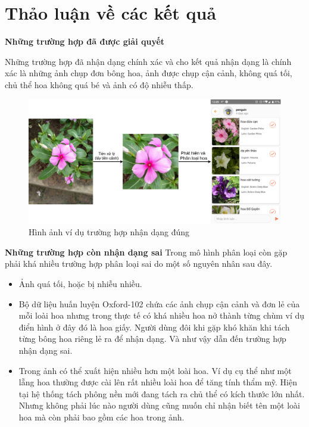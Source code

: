 \documentclass[12pt]{report}
\begin{document}
		\section{Thảo luận về các kết quả}
		
		\textbf{Những trường hợp đã được giải quyết}
		
		Những trường hợp đã nhận dạng chính xác và cho kết quả nhận dạng là chính xác là những ảnh chụp đơn bông hoa, ảnh được chụp cận cảnh, không quá tối, chủ thể hoa không quá bé và ảnh có độ nhiễu thấp.
		
		\begin{figure}[h]
			\centering
			\includegraphics[scale=0.3]{vidunhandangdung}
			\caption{Hình ảnh ví dụ trường hợp nhận dạng đúng}
			\label{fig:app_comment}
		\end{figure}
		
		\textbf{Những trường hợp còn nhận dạng sai}
		Trong mô hình phân loại còn gặp phải khá nhiều trường hợp phân loại sai do một số nguyên nhân sau đây.
		\begin{itemize}
			\item Ảnh quá tối, hoặc bị nhiễu nhiều.
			\item Bộ dữ liệu huấn luyện Oxford-102 chứa các ảnh chụp cận cảnh và đơn lẻ của mỗi loài hoa nhưng trong thực tế có khá nhiều hoa nở thành từng chùm ví dụ điển hình ở đây đó là hoa giấy. Người dùng đôi khi gặp khó khăn khi tách từng bông hoa riêng lẻ ra để nhận dạng. Và như vậy dẫn đến trường hợp nhận dạng sai.
			\item Trong ảnh có thể xuất hiện nhiều hơn một loài hoa. Ví dụ cụ thể như một lẵng hoa thường được cài lên rất nhiều loài hoa để tăng tính thẩm mỹ. Hiện tại hệ thống tách phông nền mới đang tách ra chủ thể có kích thước lớn nhất. Nhưng không phải lúc nào người dùng cũng muốn chỉ nhận biết tên một loài hoa mà còn phải bao gồm các hoa trong ảnh.
		\end{itemize}
\end{document}
